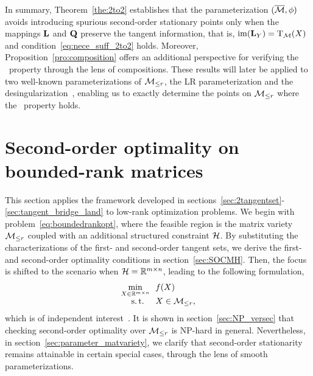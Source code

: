 In summary, Theorem~\ref{the:2to2} establishes that the parameterization $(\overline{\mathcal{M}},\phi)$ avoids introducing spurious second-order stationary points only when the mappings $\mathrm{\bf L}$ and $\mathrm{\bf Q}$ preserve the tangent information, that is, $\operatorname{im}(\mathrm{\bf L}_Y)=\mathrm{T}_{\mathcal{M}}(X)$ and condition~\eqref{eq:nece_suff_2to2} holds. Moreover, Proposition~\ref{pro:composition} offers an additional perspective for verifying the \twototwo\ property through the lens of compositions. These results will later be applied to two well-known parameterizations of $\mathcal{M}_{\le r}$, the LR parameterization and the desingularization~\cite{khrulkov2018desingularization,rebjock2024boundedrank,levin2025effect}, enabling us to exactly determine the points on $\mathcal{M}_{\le r}$ where the \twototwo\ property holds.

\section{Second-order optimality on bounded-rank matrices }\label{sec:SecondorderstationaryMr}

This section applies the framework developed in sections~\ref{sec:2tangentset}-\ref{sec:tangent_bridge_land} to low-rank optimization problems. We begin with problem~\eqref{eq:boundedrankopt}, where the feasible region is the matrix variety $\mathcal{M}_{\le r}$ coupled with an additional structured constraint $\mathcal{H}$. By substituting the characterizations of the first- and second-order tangent sets, we derive the first- and second-order optimality conditions in section~\ref{sec:SOCMH}. Then, the focus is shifted to the scenario when $\mathcal{H}=\mathbb{R}^{m\times n}$, leading to the following formulation,
\begin{equation}\label{eq:boundedrank_noH}
\begin{aligned}
    \min_{X\in\mathbb{R}^{m\times n}}\ \ & f(X)\\[-1.5mm]
    \mathrm{s.\,t.}\ \ \ \ & X\in\mathcal{M}_{\le r},
    \end{aligned}
\end{equation}
which is of independent interest~\cite{schneider2015Lojaconvergence,levin2023remedy}. It is shown in section~\ref{sec:NP_versec} that checking second-order optimality over $\mathcal{M}_{\le r}$ is NP-hard in general. Nevertheless, in section~\ref{sec:parameter_matvariety}, we clarify that second-order stationarity remains attainable in certain special cases, through the lens of smooth parameterizations.


